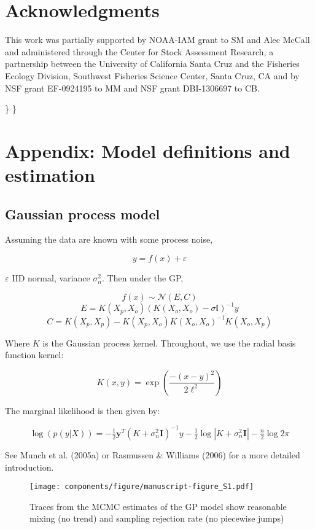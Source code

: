 \documentclass[author-year, 12pt,review]{elsarticle} %
\makeatletter
\def\maxwidth{\ifdim\Gin@nat@width>\linewidth\linewidth
\else\Gin@nat@width\fi}
\let\Oldincludegraphics\includegraphics
\renewcommand{\includegraphics}[1]{\Oldincludegraphics[width=\maxwidth]{#1}}
\makeatother
\begin{document}
\section{Acknowledgments}\label{acknowledgments}

This work was partially supported by NOAA-IAM grant to SM and Alec
McCall and administered through the Center for Stock Assessment
Research, a partnership between the University of California Santa Cruz
and the Fisheries Ecology Division, Southwest Fisheries Science Center,
Santa Cruz, CA and by NSF grant EF-0924195 to MM and NSF grant
DBI-1306697 to CB.

\appendix
\renewcommand*{\thefigure}{S\arabic{figure}}
\renewcommand*{\thetable}{S\arabic{table}} \setcounter{figure}{0}\}
\setcounter{table}{0}\}

\section{Appendix: Model definitions and
estimation}\label{appendix-model-definitions-and-estimation}

\subsection{Gaussian process model}\label{gaussian-process-model}

Assuming the data are known with some process noise,

\[y = f(x) + \varepsilon\]

$\varepsilon$ IID normal, variance $\sigma_n^2$. Then under the GP,

\[f(x) \sim \mathcal{N}(E,C)\]
\[E = K(X_p, X_o) \left(K(X_o,X_o) - \sigma \mathbb{I} \right)  ^{-1} y\]
\[C = K(X_p, X_p) - K(X_p, X_o) K(X_o,X_o)^{-1} K(X_o, X_p)\]

Where $K$ is the Gaussian process kernel. Throughout, we use the radial
basis function kernel:

\[ K(x,y) = \exp\left(\frac{-(x-y)^2}{2 \ell^2} \right)\]

The marginal likelihood is then given by:

\[\log(p(y | X)) = -\tfrac{1}{2} \mathbf{y}^T (K + \sigma_n^2 \mathbf{I})^{-1} y  - \tfrac{1}{2} \log\left| K + \sigma_n^2 \mathbf{I} \right| - \tfrac{n}{2}\log 2 \pi\]

See Munch et al. (2005a) or Rasmussen \& Williams (2006) for a more
detailed introduction.

\begin{figure}[htbp]
\centering
\texttt{[image: components/figure/manuscript-figure\_S1.pdf]}
\caption{Traces from the MCMC estimates of the GP model show reasonable
mixing (no trend) and sampling rejection rate (no piecewise jumps)}
\end{figure}
\end{document}
